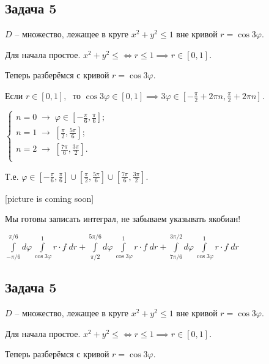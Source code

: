 \documentclass[a4paper, fleqn]{article}
\begin{document}
    \subsection*{Задача 5}
    
    $D$ -- множество, лежащее в круге $x^2 + y^2 \leq 1$ вне кривой $r = \cos 3 \varphi.$
    
    
    Для начала простое. $x^2 + y^2 \leq \iff r \leq 1 \implies r \in [0,1].$
    
    Теперь разберёмся с кривой $r  = \cos 3 \varphi$.
    
    Если $r \in [0,1], \; $ то $\cos 3 \varphi \in [0,1] \implies 3 \varphi \in \left[ -\frac{\pi}{2} + 2\pi n, \frac{\pi}{2} + 2\pi n \right].$
    
    \doublespacing $\begin{cases}
    n = 0 \; \to \; \varphi \in \left[ -\frac{\pi}{6},  \frac{\pi}{6} \right];\\
    n = 1\; \to \; \left[\frac{\pi}{2},  \frac{5\pi}{6} \right]; \\
    n = 2\; \to \;  \left[ \frac{7\pi}{6},  \frac{3\pi}{2} \right]. \\
    \end{cases}$
    
    Т.е. $\varphi \in  \left[ -\frac{\pi}{6},  \frac{\pi}{6} \right] \cup \left[\frac{\pi}{2},  \frac{5\pi}{6} \right]\cup \left[ \frac{7\pi}{6},  \frac{3\pi}{2} \right].$
    
    [picture is coming soon]
    
    \singlespacing Мы готовы записать интеграл, не забываем указывать якобиан!
    
    $\boxed{ \displaystyle \int\limits_{-\pi/6}^{\pi/6} d \varphi \int\limits_{\cos 3 \varphi}^{1} r \cdot f \; dr + \int\limits_{\pi/2}^{5\pi/6} d \varphi \int\limits_{\cos 3 \varphi}^{1} r \cdot f \; dr + 
    \int\limits_{7\pi/6}^{3\pi/2} d \varphi \int\limits_{\cos 3 \varphi}^{1} r \cdot f \; dr} \; $    
    \subsection*{Задача 5}
    
    $D$ -- множество, лежащее в круге $x^2 + y^2 \leq 1$ вне кривой $r = \cos 3 \varphi.$
    
    
    Для начала простое. $x^2 + y^2 \leq \iff r \leq 1 \implies r \in [0,1].$
    
    Теперь разберёмся с кривой $r  = \cos 3 \varphi$.
    
\end{document}
